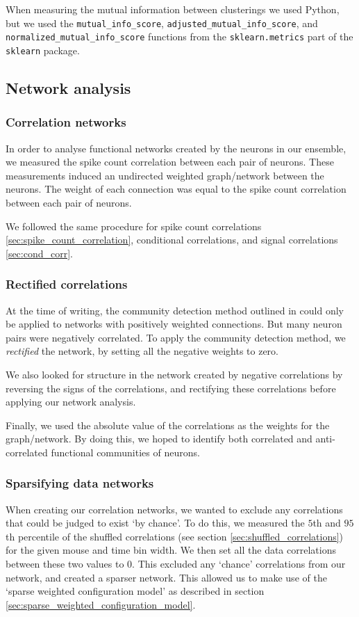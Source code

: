 \documentclass[a4paper,12pt]{article}
\theoremstyle{definition}
\begin{document}
        When measuring the mutual information between clusterings we used Python, but we used the \texttt{mutual\_info\_score}, \texttt{adjusted\_mutual\_info\_score}, and \\ \texttt{normalized\_mutual\_info\_score} functions from the \texttt{sklearn.metrics} part of the \texttt{sklearn} package.

    \subsection{Network analysis}
        \subsubsection{Correlation networks}
        In order to analyse functional networks created by the neurons in our ensemble, we measured the spike count correlation between each pair of neurons. These measurements induced an undirected weighted graph/network between the neurons. The weight of each connection was equal to the spike count correlation between each pair of neurons.

        We followed the same procedure for spike count correlations \ref{sec:spike_count_correlation}, conditional correlations, and signal correlations \ref{sec:cond_corr}.

        \subsubsection{Rectified correlations}
        At the time of writing, the community detection method outlined in \cite{humphries} could only be applied to networks with positively weighted connections. But many neuron pairs were negatively correlated. To apply the community detection method, we \textit{rectified} the network, by setting all the negative weights to zero.

        We also looked for structure in the network created by negative correlations by reversing the signs of the correlations, and rectifying these correlations before applying our network analysis.

        Finally, we used the absolute value of the correlations as the weights for the graph/network. By doing this, we hoped to identify both correlated and anti-correlated functional communities of neurons.

        \subsubsection{Sparsifying data networks}\label{sec:sparsifying_data_networks}
        When creating our correlation networks, we wanted to exclude any correlations that could be judged to exist `by chance'. To do this, we measured the $5$th and $95$th percentile of the shuffled correlations (see section \ref{sec:shuffled_correlations}) for the given mouse and time bin width. We then set all the data correlations between these two values to $0$. This excluded any `chance' correlations from our network, and created a sparser network. This allowed us to make use of the `sparse weighted configuration model' as described in section \ref{sec:sparse_weighted_configuration_model}.
\end{document}
